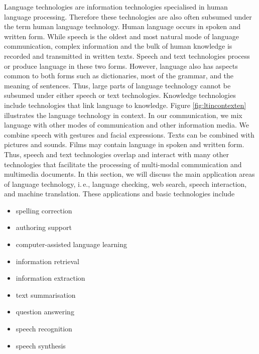 \begin{multicols}{2}

Language technologies are information technologies specialised in human
language processing. Therefore these technologies are also often
subsumed under the term human language technology. Human language occurs
in spoken and written form. While speech is the oldest and most natural
mode of language communication, complex information and the bulk of
human knowledge is recorded and transmitted in written texts. Speech and
text technologies process or produce language in these two forms.
However, language also has aspects common to both forms such as
dictionaries, most of the grammar, and the meaning of sentences. Thus,
large parts of language technology cannot be subsumed under either
speech or text technologies. Knowledge technologies include technologies
that link language to knowledge. Figure \ref{fig:ltincontexten} illustrates the language
technology in context. In our communication, we mix language with other
modes of communication and other information media. We combine speech
with gestures and facial expressions. Texts can be combined with
pictures and sounds. Films may contain language in spoken and written
form. Thus, speech and text technologies overlap and interact with many
other technologies that facilitate the processing of multi-modal
communication and multimedia documents.
In this section, we will discuss the main application areas of language technology, i.\,e., language checking, web search, speech interaction, and machine translation. These applications and basic technologies include 

\begin{itemize}
\item spelling correction
\item authoring support
\item computer-assisted language learning
\item information retrieval 
\item information extraction
\item text summarisation
\item question answering
\item speech recognition 
\item speech synthesis 
\end{itemize}


\end{multicols}

